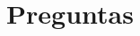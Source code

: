 \section{Preguntas}
\begin{frame}
	\begin{center}
		\begin{block}{}
		\end{block}
	\end{center}
\end{frame}
